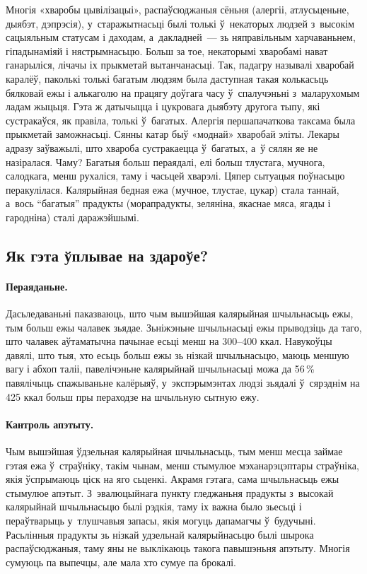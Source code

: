 
Многія «хваробы цывілізацыі», распаўсюджаныя сёньня (алергіі, атлусьценьне, дыябэт, дэпрэсія), у~старажытнасьці былі толькі ў~некаторых людзей з~высокім сацыяльным статусам і даходам, а~дакладней~--- зь няправільным харчаваньнем, гіпадынаміяй і нястрымнасьцю. Больш за тое, некаторымі хваробамі нават ганарыліся, лічачы іх прыкметай вытанчанасьці. Так, падагру называлі хваробай каралёў, паколькі толькі багатым людзям была даступная такая колькасьць бялковай ежы і алькаголю на працягу доўгага часу ў~спалучэньні з~маларухомым ладам жыцьця. Гэта ж датычыцца і цукровага дыябэту другога тыпу, які сустракаўся, як правіла, толькі ў~багатых. Алергія першапачаткова таксама была прыкметай заможнасьці. Сянны катар быў «моднай» хваробай эліты. Лекары адразу заўважылі, што хвароба сустракаецца ў~багатых, а~ў сялян яе не назіралася. Чаму? Багатыя больш пераядалі, елі больш тлустага, мучнога, салодкага, менш рухаліся, таму і часьцей хварэлі. Цяпер сытуацыя поўнасьцю перакулілася. Калярыйная бедная ежа (мучное, тлустае, цукар) стала таннай, а~вось ``багатыя'' прадукты (морапрадукты, зеляніна, якаснае мяса, ягады і гародніна) сталі даражэйшымі.

\subsection{Як гэта ўплывае на здароўе?}

\paragraph{Пераяданьне.}
Дасьледаваньні паказваюць, што чым вышэйшая калярыйная шчыльнасьць ежы, тым больш ежы чалавек зьядае. Зьніжэньне шчыльнасьці ежы прыводзіць да таго, што чалавек аўтаматычна пачынае есьці менш на 300--400 ккал. Навукоўцы давялі, што тыя, хто есьць больш ежы зь нізкай шчыльнасьцю, маюць меншую вагу і абхоп таліі, павелічэньне калярыйнай шчыльнасьці можа да 56\,\% павялічыць спажываньне калёрыяў, у~экспэрымэнтах людзі зьядалі ў~сярэднім на 425 ккал больш пры пераходзе на шчыльную сытную ежу.

\paragraph{Кантроль апэтыту.}
Чым вышэйшая ўдзельная калярыйная шчыльнасьць, тым менш месца займае гэтая ежа ў~страўніку, такім чынам, менш стымулюе мэханарэцэптары страўніка, якія ўспрымаюць ціск на яго сьценкі. Акрамя гэтага, сама шчыльнасьць ежы стымулюе апэтыт. З~эвалюцыйнага пункту гледжаньня прадукты з~высокай калярыйнай шчыльнасьцю былі рэдкія, таму іх важна было зьесьці і пераўтварыць у~тлушчавыя запасы, якія могуць дапамагчы ў~будучыні. Расьлінныя прадукты зь нізкай удзельнай калярыйнасьцю былі шырока распаўсюджаныя, таму яны не выклікаюць такога павышэньня апэтыту. Многія сумуюць па выпечцы, але мала хто сумуе па брокалі.

